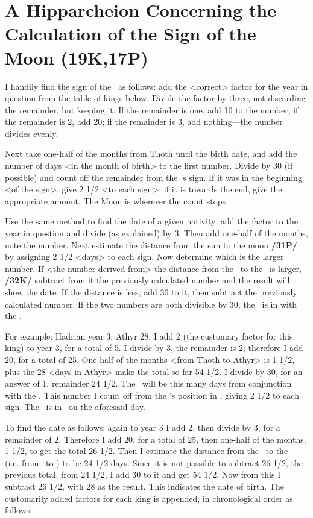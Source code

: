 \section{A Hipparcheion Concerning the Calculation of the Sign of the Moon (19K,17P)}
I handily find the sign of the \Moon\, as follows: add the <correct> factor for the year in question from the table of kings below. Divide the factor by three, not discarding the remainder, but keeping it. If the remainder is one, add 10 to the number; if the remainder is 2, add 20; if the remainder is 3, add nothing—the number divides evenly. 

Next take one-half of the months from Thoth until the birth date, and add the number of days <in the month of birth> to the first number. Divide by 30 (if possible) and count off the remainder from the \Sun’s sign. If it was in the beginning <of the sign>, give 2 1/2 <to each sign>; if it is towards the end, give the appropriate amount. The Moon is wherever the count stops.

Use the same method to find the date of a given nativity: add the factor to the year in question and divide (as explained) by 3. Then add one-half of the months, note the number. Next estimate the distance from the sun to the moon \textbf{/31P/} by assigning 2 1/2 <days> to each sign. Now determine which is the larger number. If <the number derived from> the distance from the \Sun\, to the \Moon\, is larger, \textbf{/32K/} subtract from it the previously calculated number and the result will show the date. If the distance is less, add 30 to it, then subtract the previously calculated number. If the two numbers are both divisible by 30, the \Moon\, is in \Conjunction with the \Sun.

For example: Hadrian year 3, Athyr 28. I add 2 (the customary factor for this king) to year 3, for a total of 5. I divide by 3, the remainder is 2; therefore I add 20, for a total of 25. One-half of the months <from Thoth to Athyr> is 1 1/2, plus the 28 <days in Athyr> make the total so far 54 1/2. I divide by 30, for an answer of 1, remainder 24 1/2. The \Moon\, will be this many days from conjunction with the \Sun. This number I count off from the \Sun’s position in \Sagittarius, giving 2 1/2 to each sign. The \Moon\, is in \Virgo\, on the aforesaid day.

To find the date as follows: again to year 3 I add 2, then divide by 3, for a remainder of 2. Therefore I add 20, for a total of 25, then one-half of the months, 1 1/2, to get the total 26 1/2. Then I estimate the distance from the \Sun\, to the \Moon\, (i.e. from \Sagittarius\, to \Virgo) to be 24 1/2 days. Since it is not possible to subtract 26 1/2, the previous total, from 24 1/2, I add 30 to it and get 54 1/2. Now from this I subtract 26 1/2, with 28 as the result. This indicates the date of birth. The customarily added factors for each king is appended, in chronological order as follows:


